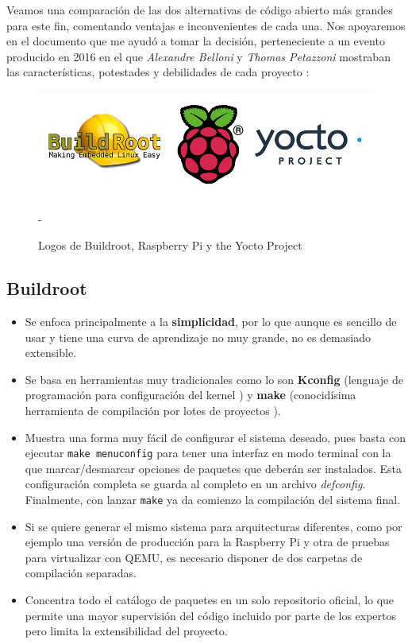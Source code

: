 Veamos una comparación de las dos alternativas de código abierto más grandes para este fin, comentando ventajas e inconvenientes de cada una. Nos apoyaremos en el documento que me ayudó a tomar la decisión, perteneciente a un evento producido en 2016 en el que \textit{Alexandre Belloni} y \textit{Thomas Petazzoni} mostraban las características, potestades y debilidades de cada proyecto \cite{yocto-vs-buildroot-event}:

\begin{figure}[H]
	\centering
	\includegraphics[width=0.6\linewidth]{imagenes/buildroot_rpi_yocto_logos.jpg}
	\caption{Logos de Buildroot, Raspberry Pi y the Yocto Project} - \cite{imagen-buildroot-rpi-yocto}
	\label{rpi-buildroot-vs-yocto}
\end{figure}

\subsection{Buildroot}

\begin{itemize}
	\item Se enfoca principalmente a la \textbf{simplicidad}, por lo que aunque es sencillo de usar y tiene una curva de aprendizaje no muy grande, no es demasiado extensible.
	\item Se basa en herramientas muy tradicionales como lo son  \textbf{Kconfig} (lenguaje de programación para configuración del kernel \cite{kconfig}) y \textbf{make} (conocidísima herramienta de compilación por lotes de proyectos \cite{make-tool}).
	\item Muestra una forma muy fácil de configurar el sistema deseado, pues basta con ejecutar \texttt{make menuconfig} para tener una interfaz en modo terminal con la que marcar/desmarcar opciones de paquetes que deberán ser instalados. Esta configuración completa se guarda al completo en un archivo \textit{defconfig}. Finalmente, con lanzar \texttt{make} ya da comienzo la compilación del sistema final.
	\item Si se quiere generar el mismo sistema para arquitecturas diferentes, como por ejemplo una versión de producción para la Raspberry Pi y otra de pruebas para virtualizar con QEMU, es necesario disponer de dos carpetas de compilación separadas.
	\item Concentra todo el catálogo de paquetes en un solo repositorio oficial, lo que permite una mayor supervisión del código incluido por parte de los expertos pero limita la extensibilidad del proyecto.
\end{itemize}

